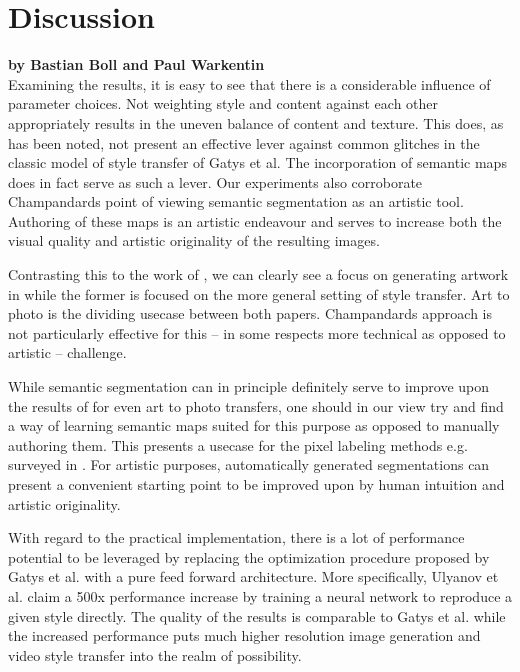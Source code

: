 
\clearpage
\section{Discussion}
\label{section:discussion}

\textbf{by Bastian Boll and Paul Warkentin} \\

Examining the results, it is easy to see that there is a considerable influence of parameter choices. Not weighting style and content against each other appropriately results in the uneven balance of content and texture. This does, as has been noted, not present an effective lever against common glitches in the classic model of style transfer of Gatys et al. The incorporation of semantic maps does in fact serve as such a lever. Our experiments also corroborate Champandards point of viewing semantic segmentation as an artistic tool. Authoring of these maps is an artistic endeavour and serves to increase both the visual quality and artistic originality of the resulting images. 

Contrasting this to the work of \cite{mrf2016}, we can clearly see a focus on generating artwork in \cite{doodles2016} while the former is focused on the more general setting of style transfer. Art to photo is the dividing usecase between both papers. Champandards approach is not particularly effective for this -- in some respects more technical as opposed to artistic -- challenge. 

While semantic segmentation can in principle definitely serve to improve upon the results of \cite{mrf2016} for even art to photo transfers, one should in our view try and find a way of learning semantic maps suited for this purpose as opposed to manually authoring them. This presents a usecase for the pixel labeling methods e.g. surveyed in \cite{thoma2016survey}. For artistic purposes, automatically generated segmentations can present a convenient starting point to be improved upon by human intuition and artistic originality.

With regard to the practical implementation, there is a lot of performance potential to be leveraged by replacing the optimization procedure proposed by Gatys et al. with a pure feed forward architecture. More specifically, Ulyanov et al. \cite{ulyanov2016texture} claim a 500x performance increase by training a neural network to reproduce a given style directly. The quality of the results is comparable to Gatys et al. while the increased performance puts much higher resolution image generation and video style transfer into the realm of possibility. 

